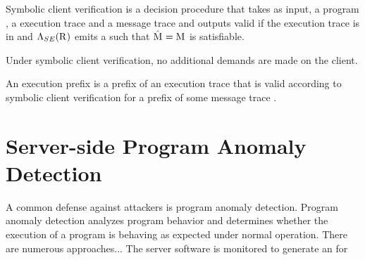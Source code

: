 \begin{definition}
  Symbolic client verification is a decision procedure that takes as
  input, a program \program{}, a execution trace \execTrace{} and a message
  trace \messageTrace{} and outputs valid if the execution trace
  \execTrace{} is in \lang{\program{}} and
  $\mathrm{\Lambda}_{SE}(\mathrm{R}_{})$ emits a \messageTraceAlt{} such that
  $\mathrm{\hat{M}_{}} = \mathrm{M}_{}$ is satisfiable.
\end{definition}

Under symbolic client verification, no additional demands are
made on the client. 

\begin{definition}
  An execution prefix \execPrefix{} is a prefix of an execution
  trace \execTrace{} that is valid according to symbolic client
  verification for a prefix of some  message trace \messageTrace{}.
\end{definition}

\section{Server-side Program Anomaly Detection}
A common defense against attackers is program anomaly detection.
Program anomaly detection analyzes program behavior and determines
whether the execution of a program is behaving as expected under
normal operation. There are numerous approaches... The server software
is monitored to generate an \execTrace{} for 

%
%
%
%
%
%
